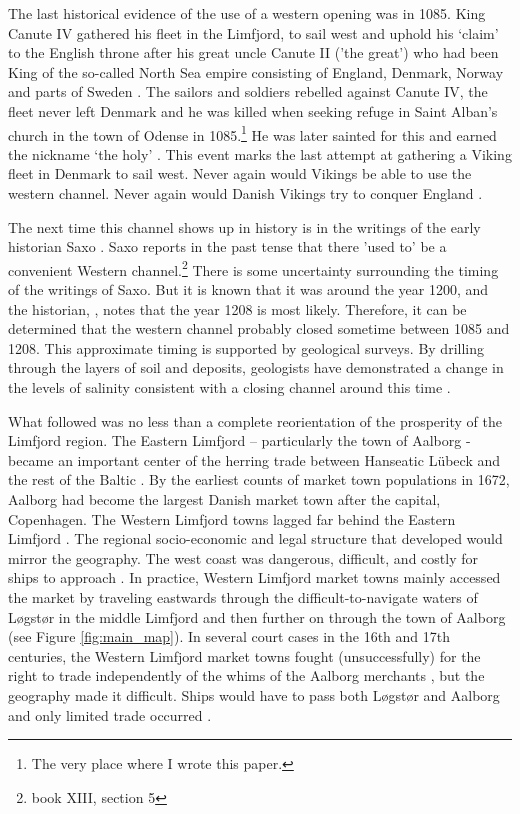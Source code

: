 \documentclass[11pt]{article}
\begin{document}
The last historical evidence of the use of a western opening was in 1085. King Canute IV gathered his fleet in the Limfjord, to sail west and uphold his ‘claim’ to the English throne after his great uncle Canute II ('the great') who had been King of the so-called North Sea empire consisting of England, Denmark, Norway and parts of Sweden \citep{Spejlborg2012}. The sailors and soldiers rebelled against Canute IV, the fleet never left Denmark and he was killed when seeking refuge in Saint Alban’s church in the town of Odense in 1085.\footnote{The very place where I wrote this paper.} He was later sainted for this and earned the nickname ‘the holy’ \citep{Pajung2012}. This event marks the last attempt at gathering a Viking fleet in Denmark to sail west. Never again would Vikings be able to use the western channel. Never again would Danish Vikings try to conquer England \citep{Roesdahl2009}.

The next time this channel shows up in history is in the writings of the early historian Saxo \cite{saxo}. Saxo reports in the past tense that there 'used to' be a convenient Western channel.\footnote{\cite{saxo} book XIII, section 5} There is some uncertainty surrounding the timing of the writings of Saxo. But it is known that it was around the year 1200, and the historian, \cite{Mortensen2018}, notes that the year 1208 is most likely. Therefore, it can be determined that the western channel probably closed sometime between 1085 and 1208. This approximate timing is supported by geological surveys. By drilling through the layers of soil and deposits, geologists have demonstrated a change in the levels of salinity consistent with a closing channel around this time \citep{Christensen2004}.

What followed was no less than a complete reorientation of the prosperity of the Limfjord region. The Eastern Limfjord – particularly the town of Aalborg - became an important center of the herring trade between Hanseatic Lübeck and the rest of the Baltic \citep{sildeboom2022}. By the earliest counts of market town populations in 1672, Aalborg had become the largest Danish market town after the capital, Copenhagen. The Western Limfjord towns lagged far behind the Eastern Limfjord \citep{Degn1989}. The regional socio-economic and legal structure that developed would mirror the geography. The west coast was dangerous, difficult, and costly for ships to approach \citep{Hald1833, p. 176}. In practice, Western Limfjord market towns mainly accessed the market by traveling eastwards through the difficult-to-navigate waters of Løgstør in the middle Limfjord and then further on through the town of Aalborg (see Figure \ref{fig:main_map}). In several court cases in the 16th and 17th centuries, the Western Limfjord market towns fought (unsuccessfully) for the right to trade independently of the whims of the Aalborg merchants \citep{ThistedLokalhistorie1974, p. 78-89}, but the geography made it difficult. Ships would have to pass both Løgstør and Aalborg and only limited trade occurred \citep{Poulsen2019}.
\end{document}

